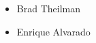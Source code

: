 \documentclass{article}
\begin{document}
\begin{itemize}
    \item Brad Theilman
    \item Enrique Alvarado
\end{itemize}
\end{document}
